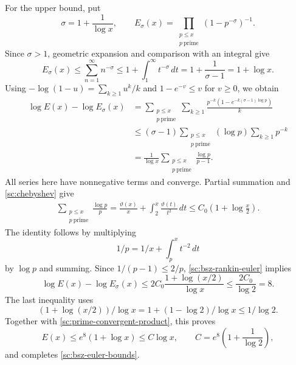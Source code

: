\documentclass[twoside]{aomart}
\makeatletter
\theoremstyle{paperplain}
\theoremstyle{paperdefinition}
\renewenvironment{proof}[1][\proofname]{\par\pushQED{\qed}%
  \normalfont\topsep6\p@\@plus3\p@\relax\trivlist
  \item[\hskip\labelsep\itshape #1\@addpunct{.}]\ignorespaces
}{\popQED\endtrivlist\@endpefalse}
\numberwithin{equation}{section}
\makeatother
\begin{document}
\begin{proof}
For the upper bound, put
\begin{equation*}
 \sigma=1+\frac1{\log x},\qquad
 E_\sigma(x)=\prod_{\substack{p\le x\\p\ \mathrm{prime}}}(1-p^{-\sigma})^{-1}.
\end{equation*}
Since $\sigma>1$, geometric expansion and comparison with an integral give
\begin{equation}
 E_\sigma(x)\le\sum_{n=1}^\infty n^{-\sigma}
 \le1+\int_1^\infty t^{-\sigma}\,dt
 =1+\frac1{\sigma-1}=1+\log x.
 \label{sc:prime-convergent-product}
\end{equation}
Using $-\log(1-u)=\sum_{k\ge1}u^k/k$ and
$1-e^{-v}\le v$ for $v\ge0$, we obtain
\begin{equation}
 \begin{aligned}
 \log E(x)-\log E_\sigma(x)
 &=\sum_{\substack{p\le x\\p\ \mathrm{prime}}}\sum_{k\ge1}
   \frac{p^{-k}(1-e^{-k(\sigma-1)\log p})}{k}\\
 &\le(\sigma-1)\sum_{\substack{p\le x\\p\ \mathrm{prime}}}(\log p)\sum_{k\ge1}p^{-k}\\
 &=\frac1{\log x}\sum_{\substack{p\le x\\p\ \mathrm{prime}}}\frac{\log p}{p-1}.
 \end{aligned}
 \label{sc:bsz-rankin-euler}
\end{equation}
All series here have nonnegative terms and converge. Partial summation
and \eqref{sc:chebyshev} give
\begin{equation*}
 \begin{aligned}
 \sum_{\substack{p\le x\\p\ \mathrm{prime}}}\frac{\log p}{p}
 =\frac{\vartheta(x)}x+\int_2^x\frac{\vartheta(t)}{t^2}\,dt
 \le C_0\left(1+\log\frac x2\right).
 \end{aligned}
\end{equation*}
The identity follows by multiplying
$$1/p=1/x+\int_p^x t^{-2}\,dt$$ by $\log p$ and summing.
Since $1/(p-1)\le2/p$, \eqref{sc:bsz-rankin-euler} implies
\begin{equation*}
 \log E(x)-\log E_\sigma(x)
 \le2C_0\frac{1+\log(x/2)}{\log x}
 \le\frac{2C_0}{\log2}=8.
\end{equation*}
The last inequality uses
$$(1+\log(x/2))/\log x=1+(1-\log2)/\log x\le1/\log2.$$
Together with \eqref{sc:prime-convergent-product}, this proves
\begin{equation*}
 E(x)\le e^8(1+\log x)\le C\log x,
 \qquad C=e^8\left(1+\frac1{\log2}\right),
\end{equation*}
and completes \eqref{sc:bsz-euler-bounds}.


\end{proof}
\end{document}
